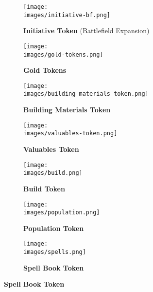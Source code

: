 \begin{figure}[H]
  \centering
  \begin{subfigure}[b]{0.16\linewidth}
    \centering
    \texttt{[image: \\images/initiative-bf.png]}
    \caption{\textbf{Initiative Token} (Battlefield Expansion)}
  \end{subfigure}
  \begin{subfigure}[b]{0.18\linewidth}
    \centering
    \texttt{[image: \\images/gold-tokens.png]}
    \caption{\textbf{Gold Tokens} \phantom{Population} \phantom{Population} \phantom{Population}}
  \end{subfigure}
  \begin{subfigure}[b]{0.12\linewidth}
    \centering
    \texttt{[image: \\images/building-materials-token.png]}
    \caption{\textbf{Building Materials Token} \phantom{Population}}
  \end{subfigure}
  \begin{subfigure}[b]{0.12\linewidth}
    \centering
    \texttt{[image: \\images/valuables-token.png]}
    \caption{\textbf{Valuables Token} \phantom{Population} \phantom{Population}}
  \end{subfigure}
  \begin{subfigure}[b]{0.12\linewidth}
    \centering
    \texttt{[image: \\images/build.png]}
    \caption{\textbf{Build Token} \phantom{Population} \phantom{Population}}
  \end{subfigure}
  \begin{subfigure}[b]{0.13\linewidth}
    \centering
    \texttt{[image: \\images/population.png]}
    \caption{\textbf{Population Token} \phantom{Population} \phantom{Population}}
  \end{subfigure}
  \begin{subfigure}[b]{0.12\linewidth}
    \centering
    \texttt{[image: \\images/spells.png]}
    \caption{\textbf{Spell Book Token} \phantom{Population}}
  \end{subfigure}
\end{figure}
\vspace*{-4em}

